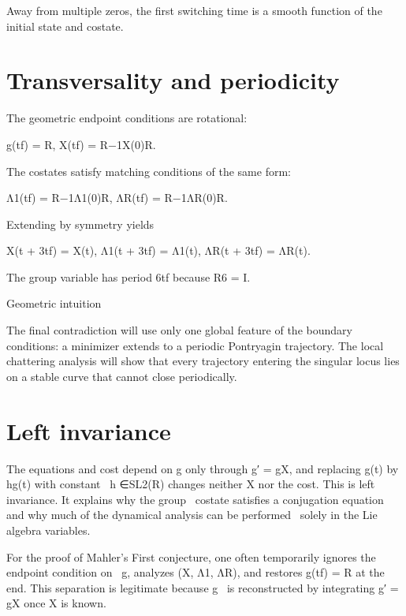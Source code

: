 Away from multiple zeros, the first switching time is a smooth function of the initial state and costate.


\section{Transversality and periodicity}

The geometric endpoint conditions are rotational:


\begin{displaytext}
g(tf) = R, X(tf) = R−1X(0)R.
\end{displaytext}

The costates satisfy matching conditions of the same form:


\begin{displaytext}
Λ1(tf) = R−1Λ1(0)R, ΛR(tf) = R−1ΛR(0)R.
\end{displaytext}

Extending by symmetry yields


\begin{displaytext}
X(t + 3tf) = X(t), Λ1(t + 3tf) = Λ1(t), ΛR(t + 3tf) = ΛR(t).
\end{displaytext}

The group variable has period 6tf because R6 = I.


\begin{insightbox}{Geometric intuition}
\end{insightbox}

The final contradiction will use only one global feature of the boundary conditions: a minimizer extends to a periodic Pontryagin trajectory. The local chattering analysis will show that every trajectory entering the singular locus lies on a stable curve that cannot close periodically.


\section{Left invariance}

\begin{displaytext}
The equations and cost depend on g only through g′ = gX, and replacing g(t) by hg(t) with constant \
h ∈SL2(R) changes neither X nor the cost. This is left invariance. It explains why the group \
costate satisfies a conjugation equation and why much of the dynamical analysis can be performed \
solely in the Lie algebra variables.
\end{displaytext}

\begin{displaytext}
For the proof of Mahler’s First conjecture, one often temporarily ignores the endpoint condition on \
g, analyzes (X, Λ1, ΛR), and restores g(tf) = R at the end. This separation is legitimate because g \
is reconstructed by integrating g′ = gX once X is known.
\end{displaytext}

